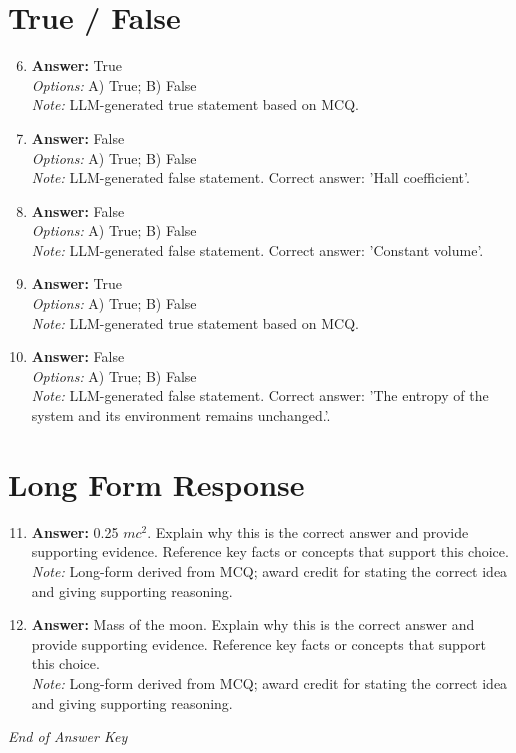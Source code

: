 \documentclass[12pt]{article}
\begin{document}
\section*{True / False}
\begin{enumerate}[label=\arabic*.]
\setcounter{enumi}{5}
\item \textbf{Answer:} True
\\ \textit{Options:} A) True; B) False
\\ \textit{Note:} LLM-generated true statement based on MCQ.
\item \textbf{Answer:} False
\\ \textit{Options:} A) True; B) False
\\ \textit{Note:} LLM-generated false statement. Correct answer: 'Hall coefficient'.
\item \textbf{Answer:} False
\\ \textit{Options:} A) True; B) False
\\ \textit{Note:} LLM-generated false statement. Correct answer: 'Constant volume'.
\item \textbf{Answer:} True
\\ \textit{Options:} A) True; B) False
\\ \textit{Note:} LLM-generated true statement based on MCQ.
\item \textbf{Answer:} False
\\ \textit{Options:} A) True; B) False
\\ \textit{Note:} LLM-generated false statement. Correct answer: 'The entropy of the system and its environment remains unchanged.'.
\end{enumerate}

\section*{Long Form Response}
\begin{enumerate}[label=\arabic*.]
\setcounter{enumi}{10}
\item \textbf{Answer:} 0.25 $mc^2$. Explain why this is the correct answer and provide supporting evidence. Reference key facts or concepts that support this choice.
\\ \textit{Note:} Long-form derived from MCQ; award credit for stating the correct idea and giving supporting reasoning.
\item \textbf{Answer:} Mass of the moon. Explain why this is the correct answer and provide supporting evidence. Reference key facts or concepts that support this choice.
\\ \textit{Note:} Long-form derived from MCQ; award credit for stating the correct idea and giving supporting reasoning.
\end{enumerate}

\vfill
\noindent\textit{End of Answer Key}
\end{document}
